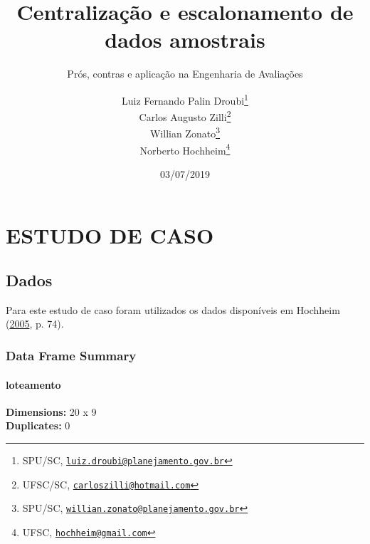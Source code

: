\documentclass[a4paper, 12pt]{article}
\title{Centralização e escalonamento de dados amostrais}
\subtitle{Prós, contras e aplicação na Engenharia de Avaliações}
\author{Luiz Fernando Palin Droubi\footnote{SPU/SC,
  \href{mailto:luiz.droubi@planejamento.gov.br}{\nolinkurl{luiz.droubi@planejamento.gov.br}}} \\ Carlos Augusto Zilli\footnote{UFSC/SC,
  \href{mailto:carloszilli@hotmail.com}{\nolinkurl{carloszilli@hotmail.com}}} \\ Willian Zonato\footnote{SPU/SC,
  \href{mailto:willian.zonato@planejamento.gov.br}{\nolinkurl{willian.zonato@planejamento.gov.br}}} \\ Norberto Hochheim\footnote{UFSC,
  \href{mailto:hochheim@gmail.com}{\nolinkurl{hochheim@gmail.com}}}}
\date{03/07/2019}
\let\oldparagraph\paragraph
\renewcommand{\paragraph}[1]{\oldparagraph{#1}\mbox{}}
\begin{document}
\maketitle

\hypertarget{estudo-de-caso}{%
\section{ESTUDO DE CASO}\label{estudo-de-caso}}

\hypertarget{dados}{%
\subsection{Dados}\label{dados}}

Para este estudo de caso foram utilizados os dados disponíveis em
Hochheim (\protect\hyperlink{ref-hochheim2005}{2005}, p. 74).

\hypertarget{data-frame-summary}{%
\subsubsection{Data Frame Summary}\label{data-frame-summary}}

\hypertarget{loteamento}{%
\paragraph{loteamento}\label{loteamento}}

\textbf{Dimensions:} 20 x 9\\
\textbf{Duplicates:} 0
\end{document}
